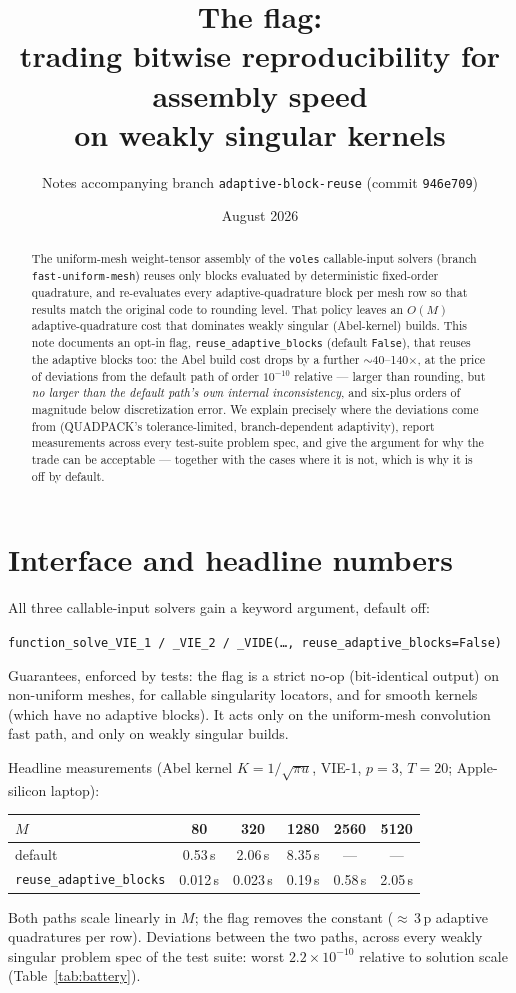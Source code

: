 \documentclass[11pt]{article}
\title{The \flag{} flag:\\
trading bitwise reproducibility for assembly speed\\ on weakly singular kernels}
\author{Notes accompanying branch \texttt{adaptive-block-reuse}
(commit \texttt{946e709})}
\date{August 2026}
\newcommand{\voles}{\texttt{voles}}
\newcommand{\flag}{\texttt{reuse\_adaptive\_blocks}}
\begin{document}
\maketitle

\begin{abstract}
\noindent
The uniform-mesh weight-tensor assembly of the \voles{} callable-input
solvers (branch \texttt{fast-uniform-mesh}) reuses only blocks evaluated
by deterministic fixed-order quadrature, and re-evaluates every
adaptive-quadrature block per mesh row so that results match the
original code to rounding level. That policy leaves an $O(M)$
adaptive-quadrature cost that dominates weakly singular (Abel-kernel)
builds. This note documents an opt-in flag,
\flag{} (default \texttt{False}), that reuses the adaptive blocks too:
the Abel build cost drops by a further $\sim$40--140$\times$, at the
price of deviations from the default path of order $10^{-10}$ relative
--- larger than rounding, but \emph{no larger than the default path's
own internal inconsistency}, and six-plus orders of magnitude below
discretization error. We explain precisely where the deviations come
from (QUADPACK's tolerance-limited, branch-dependent adaptivity), report
measurements across every test-suite problem spec, and give the argument
for why the trade can be acceptable --- together with the cases where it
is not, which is why it is off by default.
\end{abstract}

\section{Interface and headline numbers}

All three callable-input solvers gain a keyword argument, default off:
\begin{center}
\texttt{function\_solve\_VIE\_1 / \_VIE\_2 / \_VIDE(\dots,
reuse\_adaptive\_blocks=False)}
\end{center}
Guarantees, enforced by tests: the flag is a strict no-op (bit-identical
output) on non-uniform meshes, for callable singularity locators, and
for smooth kernels (which have no adaptive blocks). It acts only on the
uniform-mesh convolution fast path, and only on weakly singular builds.

Headline measurements (Abel kernel $K=1/\sqrt{\pi u}$, VIE-1, $p=3$,
$T=20$; Apple-silicon laptop):
\begin{center}
\begin{tabular}{lccccc}
\toprule
$M$ & 80 & 320 & 1280 & 2560 & 5120\\
\midrule
default    & 0.53\,s & 2.06\,s & 8.35\,s & --- & ---\\
\flag{}    & 0.012\,s & 0.023\,s & 0.19\,s & 0.58\,s & 2.05\,s\\
\bottomrule
\end{tabular}
\end{center}
Both paths scale linearly in $M$; the flag removes the constant
($\approx$\,3\,p adaptive quadratures per row). Deviations between the
two paths, across every weakly singular problem spec of the test suite:
worst $2.2\times10^{-10}$ relative to solution scale
(Table~\ref{tab:battery}).
\end{document}
